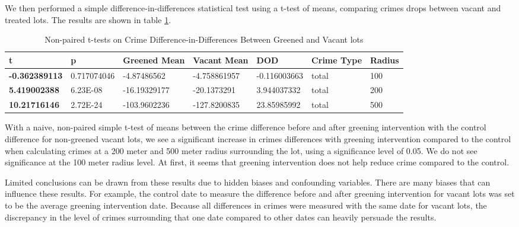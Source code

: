 \documentclass{article}
\begin{document}
   We then performed a simple difference-in-differences statistical test using a t-test of means, comparing crimes drops between vacant and treated lots. The results are shown in table \ref{tab:nonpair-t-test}.
   \begin{table}[h]
   \begin{center}
   \caption{\label{tab:nonpair-t-test}Non-paired t-tests on Crime Difference-in-Differences Between Greened and Vacant lots}
    \begin{tabular}{lllllll}
    \hline
    \textbf{t}            & \textbf{p}  & \textbf{Greened Mean} & \textbf{Vacant Mean} & \textbf{DOD} & \textbf{Crime Type} & \textbf{Radius} \\ \hline
    \textbf{-0.362389113} & 0.717074046 & -4.87486562         & -4.758861957         & -0.116003663 & total         & 100             \\
    \textbf{5.419002388}  & 6.23E-08    & -16.19329177        & -20.1373291          & 3.944037332  & total         & 200             \\
    \textbf{10.21716146}  & 2.72E-24    & -103.9602236        & -127.8200835         & 23.85985992  & total         & 500             \\
    \end{tabular}
    \end{center}
    \end{table}
    With a naive, non-paired simple t-test of means between the crime difference before and after greening intervention with the control difference for non-greened vacant lots, we see a significant increase in crimes differences with greening intervention compared to the control when calculating crimes at a 200 meter and 500 meter radius surrounding the lot, using a significance level of 0.05. We do not see significance at the 100 meter radius level. At first, it seems that greening intervention does not help reduce crime compared to the control.
    
    Limited conclusions can be drawn from these results due to hidden biases and confounding variables. There are many biases that can influence these results. For example, the control date to measure the difference before and after greening intervention for vacant lots was set to be the average greening intervention date. Because all differences in crimes were measured with the same date for vacant lots, the discrepancy in the level of crimes surrounding that one date compared to other dates can heavily persuade the results.
    
\end{document}
